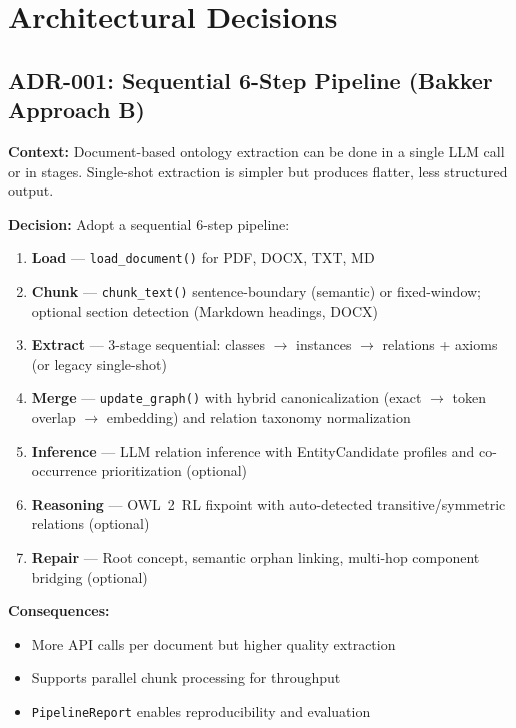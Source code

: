 \documentclass[11pt,a4paper]{article}
\begin{document}
\section{Architectural Decisions}

\subsection{ADR-001: Sequential 6-Step Pipeline (Bakker Approach B)}
\label{sec:adr-pipeline}

\textbf{Context:} Document-based ontology extraction can be done in a single LLM call or in stages. Single-shot extraction is simpler but produces flatter, less structured output.

\textbf{Decision:} Adopt a sequential 6-step pipeline:
\begin{enumerate}
    \item \textbf{Load} --- \texttt{load\_document()} for PDF, DOCX, TXT, MD
    \item \textbf{Chunk} --- \texttt{chunk\_text()} sentence-boundary (semantic) or fixed-window; optional section detection (Markdown headings, DOCX)
    \item \textbf{Extract} --- 3-stage sequential: classes $\rightarrow$ instances $\rightarrow$ relations + axioms (or legacy single-shot)
    \item \textbf{Merge} --- \texttt{update\_graph()} with hybrid canonicalization (exact $\rightarrow$ token overlap $\rightarrow$ embedding) and relation taxonomy normalization
    \item \textbf{Inference} --- LLM relation inference with EntityCandidate profiles and co-occurrence prioritization (optional)
    \item \textbf{Reasoning} --- OWL~2~RL fixpoint with auto-detected transitive/symmetric relations (optional)
    \item \textbf{Repair} --- Root concept, semantic orphan linking, multi-hop component bridging (optional)
\end{enumerate}

\textbf{Consequences:}
\begin{itemize}
    \item More API calls per document but higher quality extraction
    \item Supports parallel chunk processing for throughput
    \item \texttt{PipelineReport} enables reproducibility and evaluation
\end{itemize}
\end{document}
